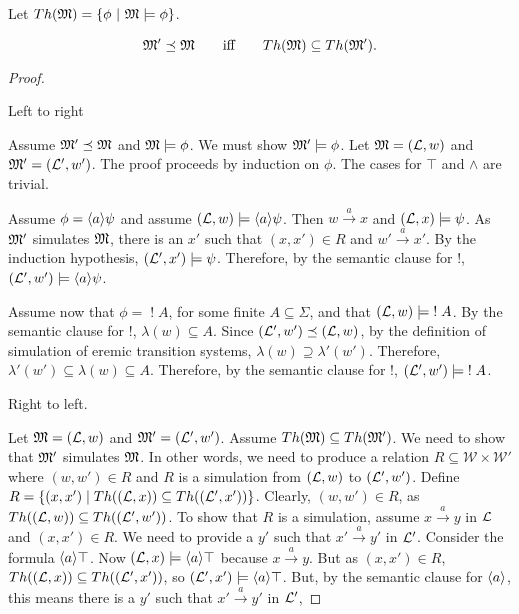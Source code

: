 
\begin{definition}
Let $Th(\frak{M}) =  \{\phi\ |\ \frak{M} \models \phi \}$.
\end{definition}

\begin{theorem}
\[
\frak{M}' \preceq \frak{M}
\qquad\text{iff}\qquad
Th(\frak{M}) \subseteq Th(\frak{M}') .
\]
\end{theorem}

\begin{proof}
\begin{case}
Left to right
\end{case}
Assume $\frak{M}' \preceq \frak{M}$ and $\frak{M} \models \phi$.
We must show $\frak{M}' \models \phi$.
Let $\frak{M} = (\mathcal{L}, w)$ and $\frak{M}' = (\mathcal{L}', w')$.
The proof proceeds by induction on $\phi$.
The cases for $\top$ and $\land$ are trivial.

Assume $\phi = \langle a \rangle \psi$ and assume  $(\mathcal{L}, w) \models  \langle a \rangle \psi$.
Then $w \xrightarrow{a} x$ and $(\mathcal{L}, x) \models  \psi$.
As $\frak{M}'$ simulates $\frak{M}$, there is an $x'$ such that $(x,x') \in R$ and $w' \xrightarrow{a} x'$.
By the induction hypothesis, $(\mathcal{L}', x') \models \psi$.
Therefore, by the semantic clause for $!$, $(\mathcal{L}', w') \models  \langle a \rangle \psi$.

Assume now that $\phi = \; ! \; A$, for some finite $A \subseteq \Sigma$, and that $(\mathcal{L}, w) \models \; ! \; A$.
By the semantic clause for $!$, $\lambda(w) \subseteq A$.
Since $(\mathcal{L}', w') \preceq (\mathcal{L}, w)$, by the definition of simulation of eremic transition systems, $\lambda(w) \supseteq \lambda'(w')$.
Therefore, $\lambda'(w') \subseteq \lambda(w) \subseteq A$.
Therefore, by the semantic clause for $!$, $(\mathcal{L}', w') \models  \; ! \; A$.

\begin{case}
Right to left.
\end{case}
Let $\frak{M} = (\mathcal{L}, w)$ and $\frak{M}' = (\mathcal{L}', w')$.
Assume $Th(\frak{M}) \subseteq Th(\frak{M}') $. We need to show that $\frak{M}'$ simulates $\frak{M}$.
In other words, we need to produce a relation $R \subseteq \mathcal{W} \times \mathcal{W}'$ where $(w,w') \in R$ and $R$ is a simulation from $(\mathcal{L}, w)$ to $ (\mathcal{L}', w')$.
Define $R = \{(x,x') \; | \; Th( (\mathcal{L}, x)) \subseteq Th( (\mathcal{L}', x'))\}$.
Clearly, $(w,w') \in R$, as $Th((\mathcal{L}, w)) \subseteq Th((\mathcal{L}', w')) $.
To show that $R$ is a simulation,  assume $x \xrightarrow{a} y$ in $\mathcal{L}$ and $(x,x') \in R$. We need to provide a $y'$ such that $x' \xrightarrow{a} y'$ in $\mathcal{L}'$.
Consider the formula $\langle a \rangle \top$. Now $(\mathcal{L}, x) \models \langle a \rangle \top$ because $x \xrightarrow{a} y$.
But as $(x,x') \in R$, $Th((\mathcal{L}, x)) \subseteq Th((\mathcal{L}', x')) $, so  $(\mathcal{L}', x') \models \langle a \rangle \top$.
But, by the semantic clause for $\MAY{a}$, this means there is a $y'$ such that $x' \xrightarrow{a} y'$ in $\mathcal{L}'$,


\end{proof}
